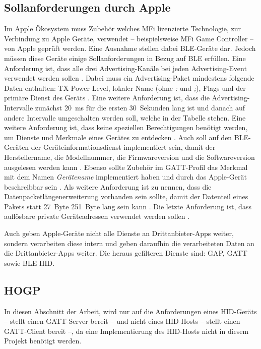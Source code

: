 \subsection{Sollanforderungen durch Apple}
Im Apple Ökosystem muss Zubehör welches \ac{MFi} lizenzierte Technologie, zur Verbindung zu Apple Geräte, verwendet -- beispielsweise \ac{MFi} Game Controller -- von Apple geprüft werden. Eine Ausnahme stellen dabei \ac{BLE}-Geräte dar. \cite{appleMfiProgram} Jedoch müssen diese Geräte einige Sollanforderungen in Bezug auf \ac{BLE} erfüllen. Eine Anforderung ist, dass alle drei Advertising-Kanäle bei jeden Advertising-Event verwendet werden sollen \cite[S.~186]{appleDesignGuide}. Dabei muss ein Advertising-Paket mindestens folgende Daten enthalten: TX Power Level, lokaler Name (ohne \textit{:} und \textit{;}), Flags und der primäre Dienst des Geräts \cite[S.~186f.]{appleDesignGuide}. Eine weitere Anforderung ist, dass die Advertising-Intervalle zunächst 20~ms für die ersten 30~Sekunden lang ist und danach auf andere Intervalle umgeschalten werden soll, welche in der Tabelle \cite[S.~187]{appleDesignGuide} stehen. Eine weitere Anforderung ist, dass keine speziellen Berechtigungen benötigt werden, um Dienste und Merkmale eines Gerätes zu entdecken \cite[S.~190]{appleDesignGuide}. Auch soll auf den \ac{BLE}-Geräten der Geräteinformationsdienst implementiert sein, damit der Herstellername, die Modellnummer, die Firmwareversion und die Softwareversion ausgelesen werden kann \cite[S.~191]{appleDesignGuide}. Ebenso sollte Zubehör im \ac{GATT}-Profil das Merkmal mit dem Namen \textit{Gerätename} implementiert haben und durch das Apple-Gerät beschreibbar sein \cite[S.~190]{appleDesignGuide}. Als weitere Anforderung ist zu nennen, dass die Datenpacketlängenerweiterung vorhanden sein sollte, damit der Datenteil eines Pakets statt 27~Byte 251~Byte lang sein kann \cite[S.~189]{appleDesignGuide}. Die letzte Anforderung ist, dass auflösbare private Geräteadressen verwendet werden sollen \cite[S.~189]{appleDesignGuide}.

Auch geben Apple-Geräte nicht alle Dienste an Drittanbieter-Apps weiter, sondern verarbeiten diese intern und geben daraufhin die verarbeiteten Daten an die Drittanbieter-Apps weiter. Die heraus gefilteren Dienste sind: \ac{GAP}, \ac{GATT} sowie \ac{BLE} \ac{HID}. \cite[S.~192]{appleDesignGuide}

\subsection{\acf{HOGP}}
In diesen Abschnitt der Arbeit, wird nur auf die Anforderungen eines \acs{HID}-Geräts -- stellt einen \acs{GATT}-Server bereit \cite[S.~9]{bluetoothHOGP} -- und nicht eines \acs{HID}-Hosts -- stellt einen \acs{GATT}-Client bereit \cite[S.~9]{bluetoothHOGP} --, da eine Implementierung des \acs{HID}-Hosts nicht in diesem Projekt benötigt werden.

